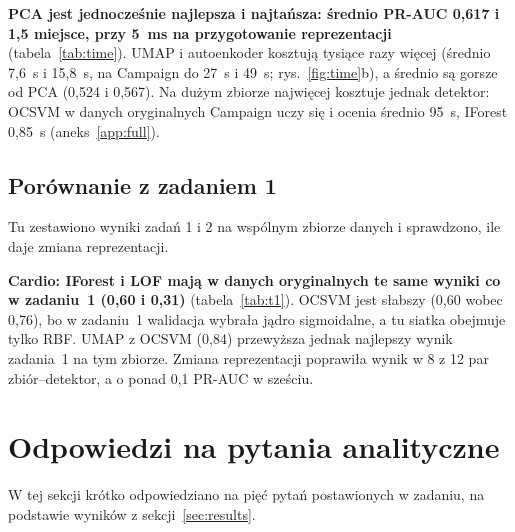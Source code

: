 \documentclass[11pt,a4paper]{article}
\begin{document}
\textbf{PCA jest jednocześnie najlepsza i najtańsza: średnio PR-AUC 0,617
i 1,5 miejsce, przy 5~ms na przygotowanie reprezentacji}
(tabela~\ref{tab:time}). UMAP i autoenkoder kosztują tysiące razy więcej
(średnio 7,6~s i 15,8~s, na Campaign do 27~s i 49~s; rys.~\ref{fig:time}b),
a średnio są gorsze od PCA (0,524 i 0,567). Na dużym zbiorze najwięcej
kosztuje jednak detektor: OCSVM w danych oryginalnych Campaign uczy się
i ocenia średnio 95~s, IForest 0,85~s (aneks~\ref{app:full}).

\FloatBarrier
\subsection{Porównanie z zadaniem 1}

Tu zestawiono wyniki zadań 1 i 2 na wspólnym zbiorze danych i sprawdzono,
ile daje zmiana reprezentacji.

\begin{table}[H]
  \centering\small
  \caption{PR-AUC detektorów w każdej reprezentacji. Zad.~1 -- najlepsze
  ustawienie z zadania~1 (tylko Cardio jest wspólny). Zysk -- najlepsza
  reprezentacja minus dane oryginalne.}
  \label{tab:t1}
\end{table}

\textbf{Cardio: IForest i LOF mają w danych oryginalnych te same wyniki co
w zadaniu~1 (0,60 i 0,31)} (tabela~\ref{tab:t1}). OCSVM jest słabszy (0,60
wobec 0,76), bo w zadaniu~1 walidacja wybrała jądro sigmoidalne, a tu
siatka obejmuje tylko RBF. UMAP z OCSVM (0,84) przewyższa jednak najlepszy
wynik zadania~1 na tym zbiorze. Zmiana reprezentacji poprawiła wynik w 8 z 12
par zbiór--detektor, a o ponad 0,1 PR-AUC w sześciu.

\FloatBarrier
\section{Odpowiedzi na pytania analityczne}

W tej sekcji krótko odpowiedziano na pięć pytań postawionych w zadaniu, na
podstawie wyników z sekcji~\ref{sec:results}.
\end{document}
